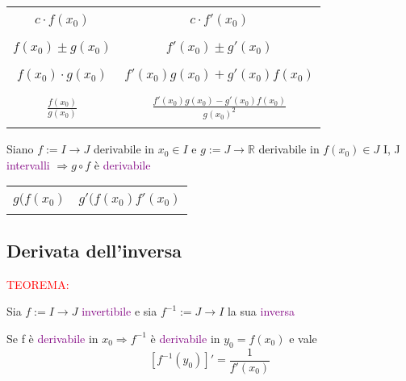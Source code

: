 \documentclass{article}
\begin{document}
\begin{table}[h]
    \centering
    \begin{tabular}{|c|c|}
        \hline
        \\
        $c\cdot f(x_0)$ & $c \cdot f'(x_0)$\\
        \\
         \hline
         \\
         $f(x_0) \pm g(x_0)$&  $f'(x_0) \pm g'(x_0)$\\
         \\
         \hline
         \\
         $f(x_0) \cdot g(x_0)$& $ f'(x_0)g(x_0) + g'(x_0)f(x_0)$ \\
         \\
         \hline
         \\
         $\frac{f(x_0)}{g(x_0)}$&  $\frac{ f'(x_0)g(x_0) - g'(x_0)f(x_0)}{g(x_0)^2}$\\
         \\
         \hline
         
    \end{tabular}
\end{table}

      \begin{tcolorbox}[colback= red!15!yellow!5!white, colframe=red]

Siano $f:= I \to J $ derivabile in $x_0 \in I$  e $ g:= J \to \mathbb{R} $ derivabile in $f(x_0) \in J $ I, J \textcolor{purple}{intervalli }$ \Rightarrow g \circ f $ è \textcolor{purple}{derivabile} 

\end{tcolorbox}

\begin{table}[h]
    \centering
    \begin{tabular}{|c|c|}
         \hline
         \\
     $g(f(x_0)$ & $g'(f(x_0)f'(x_0)$ \\
     \\
        \hline
    \end{tabular}
    
\end{table}

\subsection{Derivata dell'inversa}

      \begin{tcolorbox}[colback= red!15!yellow!5!white, colframe=red]
  \textcolor{red}{TEOREMA: }
 
Sia $f:= I \to J $ \textcolor{purple}{invertibile} e sia $f^{-1}:= J \to I$ la sua \textcolor{purple}{inversa}

Se f è \textcolor{purple}{derivabile} in $x_0 \Rightarrow f^{-1}$ è \textcolor{purple}{derivabile } in $y_0=f(x_0)$ e vale 
\[[f^{-1}(y_0)]' = \frac{1}{f'(x_0)}\]


\end{tcolorbox}
\end{document}
